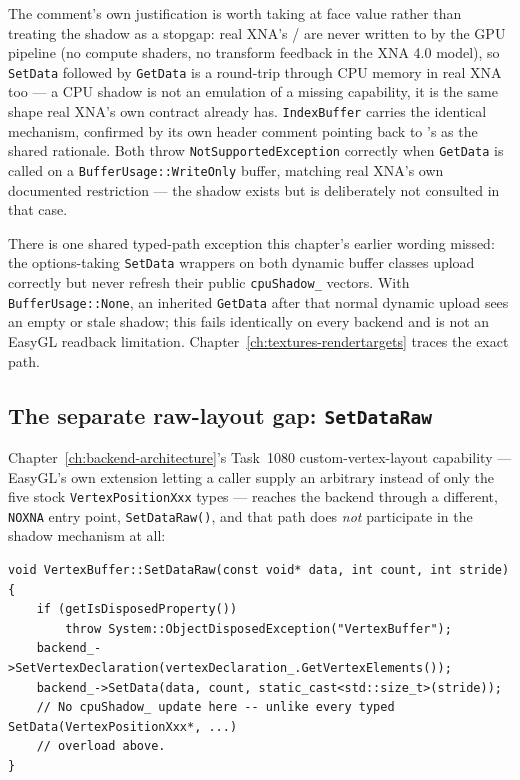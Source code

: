 The comment's own justification is worth taking at face value rather than treating the shadow
as a stopgap: real XNA's  /  are never written to
by the GPU pipeline (no compute shaders, no transform feedback in the XNA 4.0 model), so
\texttt{SetData} followed by \texttt{GetData} is a round-trip through CPU memory in real XNA
too --- a CPU shadow is not an emulation of a missing capability, it is the same shape real
XNA's own contract already has. \texttt{IndexBuffer} carries the identical mechanism, confirmed
by its own header comment pointing back to 's as the shared rationale.
Both throw \texttt{NotSupportedException} correctly when \texttt{GetData} is called on a
\texttt{BufferUsage::WriteOnly} buffer, matching real XNA's own documented restriction --- the
shadow exists but is deliberately not consulted in that case.

There is one shared typed-path exception this chapter's earlier wording missed:
the options-taking \texttt{SetData} wrappers on both dynamic buffer classes upload correctly
but never refresh their public \texttt{cpuShadow\_} vectors. With
\texttt{BufferUsage::None}, an inherited \texttt{GetData} after that normal dynamic upload
sees an empty or stale shadow; this fails identically on every backend and is not an EasyGL
readback limitation. Chapter~\ref{ch:textures-rendertargets} traces the exact path.

\subsection{The separate raw-layout gap: \texttt{SetDataRaw}}

Chapter~\ref{ch:backend-architecture}'s Task~1080 custom-vertex-layout capability --- EasyGL's
own extension letting a caller supply an arbitrary  instead of only
the five stock \texttt{VertexPositionXxx} types --- reaches the backend through a different,
\texttt{NOXNA} entry point, \texttt{SetDataRaw()}, and that path does \emph{not} participate in
the shadow mechanism at all:

\begin{lstlisting}
void VertexBuffer::SetDataRaw(const void* data, int count, int stride)
{
    if (getIsDisposedProperty())
        throw System::ObjectDisposedException("VertexBuffer");
    backend_->SetVertexDeclaration(vertexDeclaration_.GetVertexElements());
    backend_->SetData(data, count, static_cast<std::size_t>(stride));
    // No cpuShadow_ update here -- unlike every typed SetData(VertexPositionXxx*, ...)
    // overload above.
}
\end{lstlisting}


